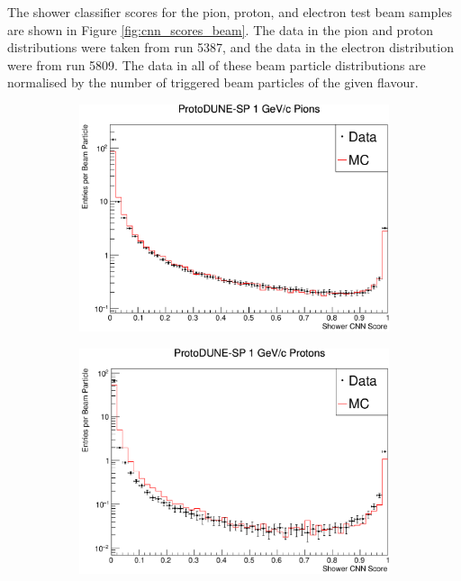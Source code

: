 The shower classifier scores for the pion, proton, and electron test beam 
samples are shown in Figure \ref{fig:cnn_scores_beam}. The data in the pion 
and proton distributions were taken from \protodune{} run 5387, and the data in 
the electron distribution were from run 5809. The data in all of these beam
particle distributions are normalised by the number of triggered 
beam particles of the given flavour.
\begin{figure}

	\centering

	\begin{subfigure}[b]{0.64\textwidth}
		\centering
		\includegraphics[width=\textwidth]{figures/hit_cnn_pion.pdf}
		\label{fig:beam_pi_cnn}
	\end{subfigure}

	\begin{subfigure}[b]{0.64\textwidth}
		\centering
		\includegraphics[width=\textwidth]{figures/hit_cnn_proton.pdf}
		\label{fig:beam_proton_cnn}
	\end{subfigure}


\end{figure}
